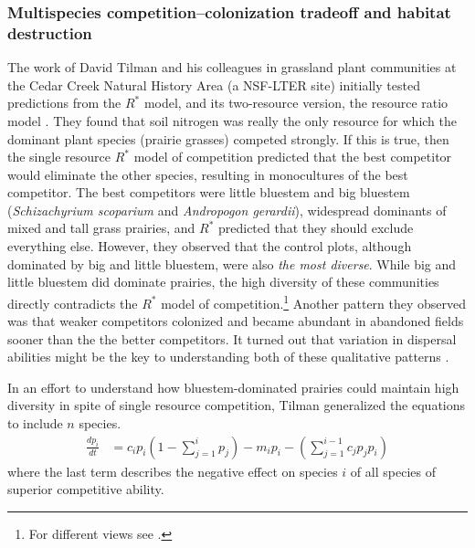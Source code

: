 \subsubsection{Multispecies competition--colonization tradeoff and habitat destruction}
The work of David Tilman and his colleagues in grassland plant communities at the Cedar Creek Natural History Area (a NSF-LTER site) initially tested predictions from the $R^*$ model, and its two-resource version, the resource ratio model \cite{Tilman1982,tilman1988,Wedin1993,Wilson1995}. They found that soil nitrogen was really the only resource for which the dominant plant species (prairie grasses) competed strongly. If this is true, then the single resource $R^*$ model of competition predicted that the best competitor would eliminate the other species, resulting in monocultures of the best competitor. The best competitors were little bluestem and big bluestem (\emph{Schizachyrium scoparium} and \emph{Andropogon gerardii}), widespread dominants of mixed and tall grass prairies, and $R^*$ predicted that they should exclude everything else. However, they observed that the control plots, although dominated by big and little bluestem, were also \emph{the most diverse}. While big and little bluestem did dominate prairies, the high diversity of these communities directly contradicts the $R^*$ model of competition.\footnote{For different views see \cite{Craine:2005qy,Tilman:2007yb}.} Another pattern they observed was that weaker competitors colonized and became abundant in abandoned fields sooner than the  the better competitors. It turned out that variation in dispersal abilities might be the key to understanding both of these qualitative patterns \cite{Gross1982,Platt1977,Rabinowitz1981}.

In an effort to understand how bluestem-dominated prairies could maintain high diversity in spite of single resource competition,  Tilman generalized the \cite{Hastings:1980kx} equations to include $n$ species\cite{Tilman1994}.
\begin{align}
  \label{eq:cc10}
  \frac{dp_i}{dt} &= c_ip_i\left(1-\sum_{j=1}^{i}{p_j}\right) - m_ip_i - \left(\sum_{j=1}^{i-1}{c_jp_jp_i}\right)
\end{align}
where the last term describes the negative effect on species $i$ of all species of superior competitive ability.

